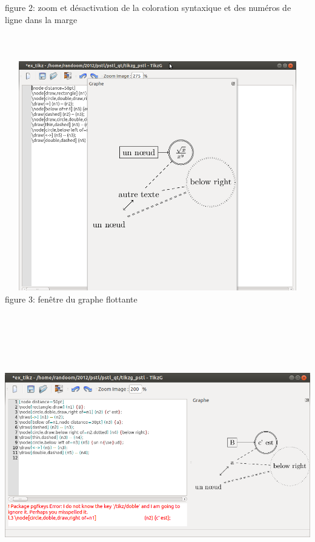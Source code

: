 \documentclass[a4paper]{report}
\begin{document}
figure 2: zoom et désactivation de la coloration syntaxique et des numéros de ligne dans la marge
\newline
\\
\\
\\
\\
  \includegraphics[width=15cm, height=10cm]{img/r_42.png} 
\\
figure 3: fenêtre du graphe flottante
\newline
\\
\\
\\
\\
  \includegraphics[width=15cm, height=10cm]{img/r_2.png} 
\\
\end{document}
